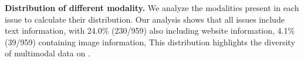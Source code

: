 \textbf{Distribution of different modality.} 
We analyze the modalities present in each issue to calculate their distribution. Our analysis shows that all issues include text information, with 24.0\% (230/959) also including website information, 4.1\% (39/959) containing image information, This distribution highlights the diversity of multimodal data on \Swebenchx.


     

